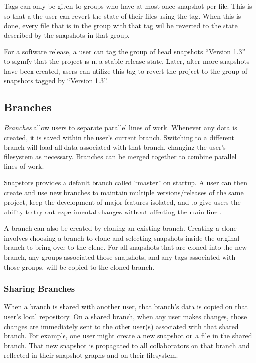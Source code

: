 Tags can only be given to groups who have at most once snapshot per file. This is so that a the user can revert the state of their files using the tag. When this is done, every file that is in the group with that tag wil be reverted to the state described by the snapshots in that group.

For a software release, a user can tag the group of head snapshots ``Version 1.3'' to signify that the project is in a stable release state. Later, after more snapshots have been created, users can utilize this tag to revert the project to the group of snapshots tagged by ``Version 1.3''.

\subsection{Branches}

\textit{Branches} allow users to separate parallel lines of work. Whenever any data is created, it is saved within the user's current branch. Switching to a different branch will load all data associated with that branch, changing the user's filesystem as necessary. Branches can be merged together to combine parallel lines of work.

Snapstore provides a default branch called ``master'' on startup. A user can then create and use new branches to maintain multiple versions/releases of the same project, keep the development of major features isolated, and to give users the ability to try out experimental changes without affecting the main line \cite{RossoJackson}.

A branch can also be created by cloning an existing branch. Creating a clone involves choosing a branch to clone and selecting snapshots inside the original branch to bring over to the clone. For all snapshots that are cloned into the new branch, any groups associated those snapshots, and any tags associated with those groups, will be copied to the cloned branch.

\subsubsection{Sharing Branches}

When a branch is shared with another user, that branch's data is copied on that user's local repository. On a shared branch, when any user makes changes, those changes are immediately sent to the other user(s) associated with that shared branch. For example, one user might create a new snapshot on a file in the shared branch. That new snapshot is propagated to all collaborators on that branch and reflected in their snapshot graphs and on their filesystem.

